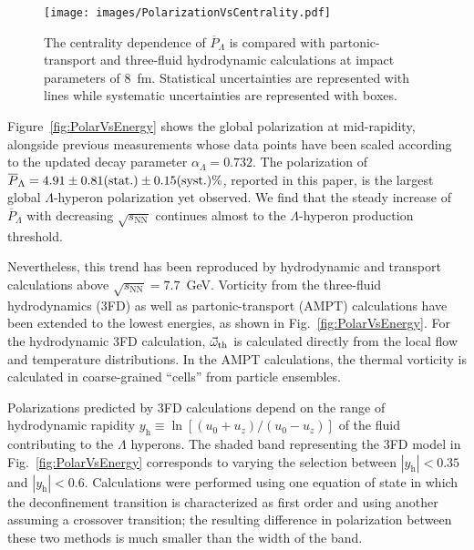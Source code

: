 \documentclass[
  reprint,
  superscriptaddress,
  amsmath,
  amssymb,
  aps,
  floatfix,
]{revtex4-2}
\newcommand{\sNN}{\sqrt{s_\mathrm{NN}}}
\newcommand{\PLambda}{\overline{P}_{\Lambda}}
\begin{document}
\begin{figure}[t]
  \centering
  \texttt{[image: images/PolarizationVsCentrality.pdf]}
  \caption{The centrality dependence of $\PLambda$ 
           is compared with partonic-transport\cite{guo2021locating} 
           and three-fluid hydrodynamic\cite{Ivanov:2020udj} calculations at
           impact parameters of 8~fm. Statistical
           uncertainties are represented with lines while
           systematic uncertainties are represented with boxes.
            \label{fig:Centrality}}
\end{figure}

Figure~\ref{fig:PolarVsEnergy} shows the global polarization at
 mid-rapidity, alongside previous measurements whose data
 points have been scaled according to
 the updated decay parameter $\alpha_\Lambda=0.732$\cite{Zyla:2020zbs}. The
 polarization of $\PLambda=4.91\pm0.81(\rm stat.)\pm0.15(\rm syst.)\%$, reported
 in this paper, is the largest
 global $\Lambda$-hyperon polarization yet observed. We
 find that the steady increase of
 $\PLambda$ with decreasing $\sNN$ continues almost
 to the $\Lambda$-hyperon production threshold.

Nevertheless, this trend has been reproduced
 by hydrodynamic and transport calculations\cite{Becattini:2020ngo,Vitiuk:2019rfv,Li:2017slc,Sun:2017xhx} above
 $\sNN=7.7$~GeV. Vorticity from the three-fluid hydrodynamics
 (3FD)\cite{Ivanov:2020udj} as well as
 partonic-transport (AMPT)\cite{guo2021locating} calculations
 have been extended to the lowest
 energies, as shown in Fig.~\ref{fig:PolarVsEnergy}.
 For the hydrodynamic 3FD calculation,
 $\vec{\omega}_{\rm th}$ is calculated directly from
 the local flow and temperature distributions.
 In the AMPT calculations, the thermal
 vorticity is calculated in coarse-grained ``cells''
 from particle ensembles\cite{Li:2017slc}.

Polarizations predicted by 3FD calculations depend
 on the range of hydrodynamic rapidity
 $y_\mathrm{h}\equiv\ln\left[\left(u_0+u_z\right)/\left(u_0-u_z\right)\right]$ of the fluid contributing to
 the $\Lambda$ hyperons\cite{Ivanov:2020wak}. The shaded band
 representing the 3FD model in Fig.~\ref{fig:PolarVsEnergy}
 corresponds to varying the selection between
 $|y_\mathrm{h}|<0.35$ and $|y_\mathrm{h}|<0.6$. Calculations were performed
 using one equation of state in
 which the deconfinement transition is characterized
 as first order and using another
 assuming a crossover transition; the resulting
 difference in polarization between these two
 methods is much smaller than the
 width of the band.
\end{document}
